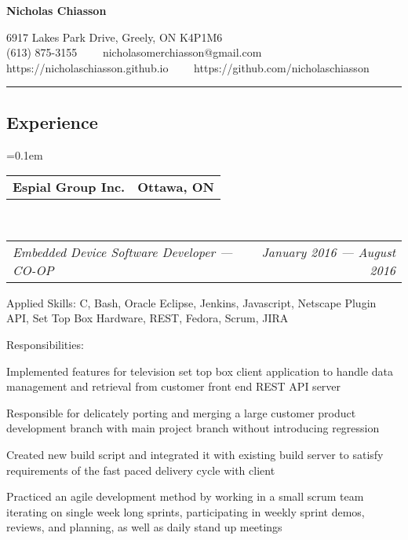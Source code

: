 \documentclass[10pt,letterpaper]{article}
\makeatletter
\newenvironment{indentsection}[1]%
{\begin{list}{}%
  {\setlength{\leftmargin}{#1}}%
  \item[]%
}
{\end{list}}
\newcommand{\headerrow}[2]
{\begin{tabular*}{\linewidth}{l@{\extracolsep{\fill}}r}
  #1 &
  #2 \\
\end{tabular*}}
\newcommand{\formalname}
{Nicholas Chiasson}
\makeatother
\begin{document}
\begin{center}
{\LARGE \textbf{\formalname}}

6917 Lakes Park Drive, Greely, ON K4P1M6
\\
(613) 875-3155\ \ \textbullet
\ \ nicholasomerchiasson@gmail.com
\\
https://nicholaschiasson.github.io\ \ \textbullet
\ \ https://github.com/nicholaschiasson
\end{center}

\hrule
\vspace{-0.4em}
\subsection*{Experience}

\begin{itemize}
  \parskip=0.1em

  \item
  \headerrow
    {\textbf{Espial Group Inc.}}
    {\textbf{Ottawa, ON}}
  \\
  \headerrow
    {\emph{Embedded Device Software Developer — CO-OP}}
    {\emph{January 2016 — August 2016}}
  \begin{indentsection}{1em}
    \begin{description*}
      \item[Applied Skills:]
      C, Bash, Oracle Eclipse, Jenkins, Javascript, Netscape Plugin API, Set Top
      Box Hardware, REST, Fedora, Scrum, JIRA
      \item[Responsibilities:]
      \hfill
      \begin{itemize*}
        \item Implemented features for television set top box client application
        to handle data management and retrieval from customer front end REST API
        server
        \item Responsible for delicately porting and merging a large customer
        product development branch with main project branch without introducing
        regression
        \item Created new build script and integrated it with existing build
        server to satisfy requirements of the fast paced delivery cycle with
        client
        \item Practiced an agile development method by working in a small scrum
        team iterating on single week long sprints, participating in weekly sprint
        demos, reviews, and planning, as well as daily stand up meetings
      \end{itemize*}
    \end{description*}
  \end{indentsection}


\end{itemize}
\end{document}
